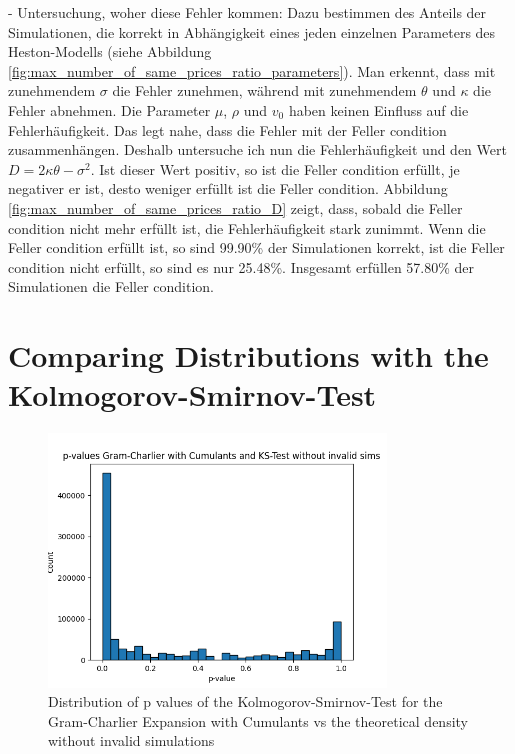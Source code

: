 - Untersuchung, woher diese Fehler kommen: Dazu bestimmen des Anteils der Simulationen, die korrekt in Abhängigkeit eines jeden einzelnen Parameters des Heston-Modells (siehe Abbildung \ref{fig:max_number_of_same_prices_ratio_parameters}). Man erkennt, dass mit zunehmendem $\sigma$ die Fehler zunehmen, während mit zunehmendem $\theta$ und $\kappa$ die Fehler abnehmen. Die Parameter $\mu$, $\rho$ und $v_0$ haben keinen Einfluss auf die Fehlerhäufigkeit. Das legt nahe, dass die Fehler mit der Feller condition zusammenhängen. Deshalb untersuche ich nun die Fehlerhäufigkeit und den Wert $D = 2\kappa\theta - \sigma^2$. Ist dieser Wert positiv, so ist die Feller condition erfüllt, je negativer er ist, desto weniger erfüllt ist die Feller condition. Abbildung \ref{fig:max_number_of_same_prices_ratio_D} zeigt, dass, sobald die Feller condition nicht mehr erfüllt ist, die Fehlerhäufigkeit stark zunimmt. Wenn die Feller condition erfüllt ist, so sind 99.90\% der Simulationen korrekt, ist die Feller condition nicht erfüllt, so sind es nur 25.48\%. Insgesamt erfüllen 57.80\% der Simulationen die Feller condition.

\section{Comparing Distributions with the Kolmogorov-Smirnov-Test}

\begin{figure}
    \centering
    \includegraphics[width=0.8\textwidth]{img/GC_cum_KS_p_value_histogram.png}
    \caption{Distribution of p values of the Kolmogorov-Smirnov-Test for the Gram-Charlier Expansion with Cumulants vs the theoretical density without invalid simulations}
    \label{fig:GC_cum_KS_p_value_histogram}
\end{figure}

